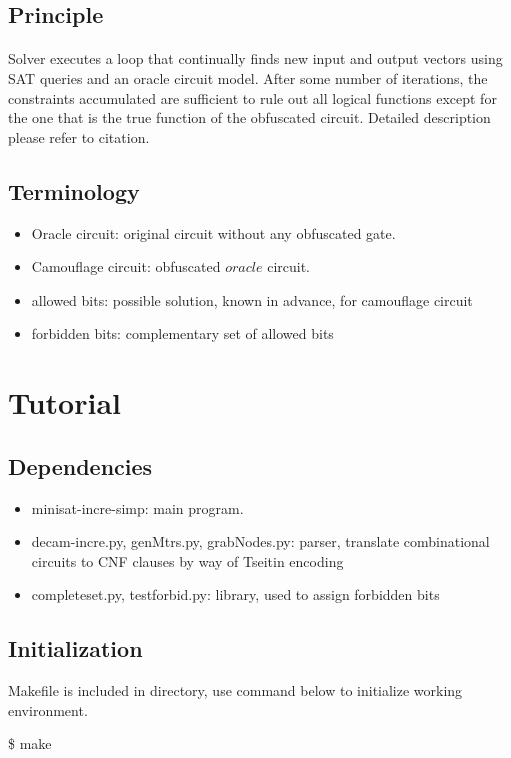 \documentclass{article}
\begin{document}
	\subsection{Principle} 
	\paragraph{}Solver executes a loop that continually finds new input and output vectors using SAT queries and an oracle circuit model. After some number of iterations, the constraints accumulated are sufficient to rule out all logical functions except for the one that is the true function of the obfuscated circuit. Detailed description please refer to citation. 
	\subsection{Terminology}
		\begin{itemize}
			\item Oracle circuit: original circuit without any obfuscated gate.
			\item Camouflage circuit: obfuscated $oracle$ circuit.
			\item allowed bits: possible solution, known in advance, for camouflage circuit
			\item forbidden bits: complementary set of allowed bits
		\end{itemize}

\section{Tutorial}
	\subsection{Dependencies}
		\begin{itemize}
			\item minisat-incre-simp: main program.
			\item decam-incre.py, genMtrs.py, grabNodes.py: parser, translate combinational circuits to CNF clauses by way of Tseitin encoding
			\item completeset.py, testforbid.py: library, used to assign forbidden bits
		\end{itemize}
	\subsection{Initialization}
		Makefile is included in directory, use command below to initialize working environment.
		\newline 
		\centerline{\$ make}
\end{document}
